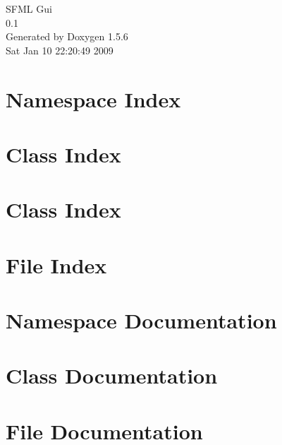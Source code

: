 \documentclass[a4paper]{book}
\begin{document}
\begin{titlepage}
\vspace*{7cm}
\begin{center}
{\Large SFML Gui \\[1ex]\large 0.1 }\\
\vspace*{1cm}
{\large Generated by Doxygen 1.5.6}\\
\vspace*{0.5cm}
{\small Sat Jan 10 22:20:49 2009}\\
\end{center}
\end{titlepage}
\clearemptydoublepage
{}
\tableofcontents
\clearemptydoublepage
{}
\chapter{Namespace Index}

\chapter{Class Index}

\chapter{Class Index}

\chapter{File Index}

\chapter{Namespace Documentation}

\chapter{Class Documentation}








\chapter{File Documentation}

















\printindex
\end{document}
